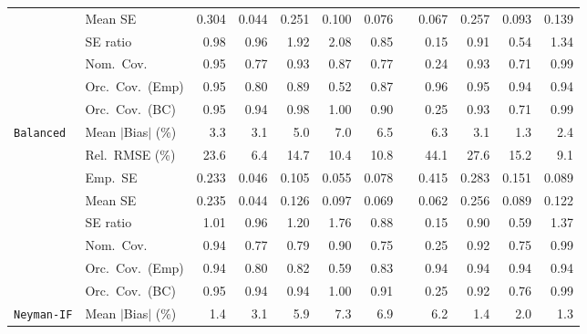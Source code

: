 \begin{landscape}
\begin{longtable}{llrrrrrrrrrr}
 & Mean SE & 0.304 & 0.044 & 0.251 & 0.100 & 0.076 &  & 0.067 & 0.257 & 0.093 & 0.139 \\
 & SE ratio & \cellcolor{rankone}0.98 & \cellcolor{ranktwo}0.96 & 1.92 & 2.08 & 0.85 &  & 0.15 & \cellcolor{rankthree}0.91 & 0.54 & 1.34 \\
 & Nom.\ Cov. & \cellcolor{rankone}0.95 & 0.77 & \cellcolor{ranktwo}0.93 & 0.87 & 0.77 &  & 0.24 & \cellcolor{ranktwo}0.93 & 0.71 & \cellcolor{rankthree}0.99 \\
 & Orc.\ Cov.\ (Emp) & \cellcolor{rankone}0.95 & 0.80 & \cellcolor{rankthree}0.89 & 0.52 & 0.87 &  & \cellcolor{ranktwo}0.96 & \cellcolor{rankone}0.95 & \cellcolor{ranktwo}0.94 & \cellcolor{ranktwo}0.94 \\
 & Orc.\ Cov.\ (BC) & \cellcolor{rankone}0.95 & \cellcolor{ranktwo}0.94 & 0.98 & 1.00 & 0.90 &  & 0.25 & \cellcolor{rankthree}0.93 & 0.71 & 0.99 \\
\addlinespace[2pt]
\quad \texttt{Balanced} & Mean $|$Bias$|$ (\%) & 3.3 & \cellcolor{rankthree}3.1 & 5.0 & 7.0 & 6.5 &  & 6.3 & \cellcolor{rankthree}3.1 & \cellcolor{rankone}1.3 & \cellcolor{ranktwo}2.4 \\
 & Rel.\ RMSE (\%) & 23.6 & \cellcolor{rankone}6.4 & 14.7 & \cellcolor{rankthree}10.4 & 10.8 &  & 44.1 & 27.6 & 15.2 & \cellcolor{ranktwo}9.1 \\
 & Emp.\ SE & 0.233 & 0.046 & 0.105 & 0.055 & 0.078 &  & 0.415 & 0.283 & 0.151 & 0.089 \\
 & Mean SE & 0.235 & 0.044 & 0.126 & 0.097 & 0.069 &  & 0.062 & 0.256 & 0.089 & 0.122 \\
 & SE ratio & \cellcolor{rankone}1.01 & \cellcolor{ranktwo}0.96 & 1.20 & 1.76 & 0.88 &  & 0.15 & \cellcolor{rankthree}0.90 & 0.59 & 1.37 \\
 & Nom.\ Cov. & \cellcolor{rankone}0.94 & 0.77 & 0.79 & 0.90 & 0.75 &  & 0.25 & \cellcolor{ranktwo}0.92 & 0.75 & \cellcolor{rankthree}0.99 \\
 & Orc.\ Cov.\ (Emp) & \cellcolor{rankone}0.94 & 0.80 & \cellcolor{rankthree}0.82 & 0.59 & \cellcolor{ranktwo}0.83 &  & \cellcolor{rankone}0.94 & \cellcolor{rankone}0.94 & \cellcolor{rankone}0.94 & \cellcolor{rankone}0.94 \\
 & Orc.\ Cov.\ (BC) & \cellcolor{rankone}0.95 & \cellcolor{ranktwo}0.94 & \cellcolor{ranktwo}0.94 & 1.00 & 0.91 &  & 0.25 & \cellcolor{rankthree}0.92 & 0.76 & 0.99 \\
\addlinespace[2pt]
\quad \texttt{Neyman-IF} & Mean $|$Bias$|$ (\%) & \cellcolor{ranktwo}1.4 & 3.1 & 5.9 & 7.3 & 6.9 &  & 6.2 & \cellcolor{ranktwo}1.4 & \cellcolor{rankthree}2.0 & \cellcolor{rankone}1.3 \\

\end{longtable}
\end{landscape}

